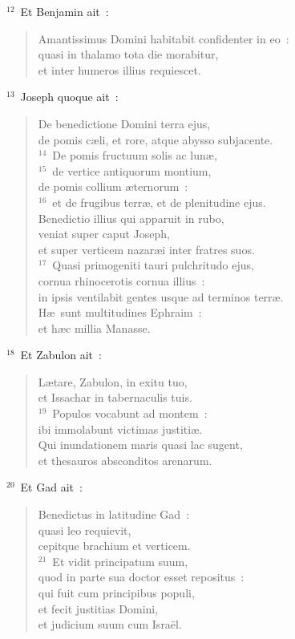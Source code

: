 ${}^{12}$~Et Benjamin ait~: \begin{verse}Amantissimus Domini habitabit confidenter in eo~:\\ quasi in thalamo tota die morabitur,\\ et inter humeros illius requiescet.\end{verse}


${}^{13}$~Joseph quoque ait~: \begin{verse}De benedictione Domini terra ejus,\\ de pomis c\ae li, et rore, atque abysso subjacente.\\
${}^{14}$~De pomis fructuum solis ac lun\ae ,\\
${}^{15}$~de vertice antiquorum montium,\\ de pomis collium \ae ternorum~:\\
${}^{16}$~et de frugibus terr\ae , et de plenitudine ejus.\\ Benedictio illius qui apparuit in rubo,\\ veniat super caput Joseph,\\ et super verticem nazar\ae i inter fratres suos.\\
${}^{17}$~Quasi primogeniti tauri pulchritudo ejus,\\ cornua rhinocerotis cornua illius~:\\ in ipsis ventilabit gentes usque ad terminos terr\ae .\\ H\ae\ sunt multitudines Ephraim~:\\ et h\ae c millia Manasse.\end{verse}


${}^{18}$~Et Zabulon ait~: \begin{verse}L\ae tare, Zabulon, in exitu tuo,\\ et Issachar in tabernaculis tuis.\\
${}^{19}$~Populos vocabunt ad montem~:\\ ibi immolabunt victimas justiti\ae .\\ Qui inundationem maris quasi lac sugent,\\ et thesauros absconditos arenarum.\end{verse}


${}^{20}$~Et Gad ait~: \begin{verse}Benedictus in latitudine Gad~:\\ quasi leo requievit,\\ cepitque brachium et verticem.\\
${}^{21}$~Et vidit principatum suum,\\ quod in parte sua doctor esset repositus~:\\ qui fuit cum principibus populi,\\ et fecit justitias Domini,\\ et judicium suum cum Isra\"el.\end{verse}


